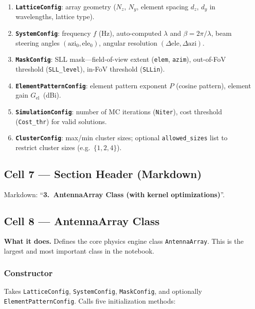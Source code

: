 \documentclass[11pt,a4paper]{article}
\begin{document}
\begin{enumerate}
    \item \textbf{\texttt{LatticeConfig}}: array geometry ($N_z$, $N_y$, element spacing
          $d_z$, $d_y$ in wavelengths, lattice type).
    \item \textbf{\texttt{SystemConfig}}: frequency $f$ (Hz), auto-computed $\lambda$ and
          $\beta = 2\pi/\lambda$, beam steering angles $(\text{azi}_0, \text{ele}_0)$,
          angular resolution $(\Delta\text{ele}, \Delta\text{azi})$.
    \item \textbf{\texttt{MaskConfig}}: SLL mask---field-of-view extent
          (\texttt{elem}, \texttt{azim}), out-of-FoV threshold (\texttt{SLL\_level}),
          in-FoV threshold (\texttt{SLLin}).
    \item \textbf{\texttt{ElementPatternConfig}}: element pattern exponent $P$
          (cosine pattern), element gain $G_{\text{el}}$~(dBi).
    \item \textbf{\texttt{SimulationConfig}}: number of MC iterations (\texttt{Niter}),
          cost threshold (\texttt{Cost\_thr}) for valid solutions.
    \item \textbf{\texttt{ClusterConfig}}: max/min cluster sizes;
          optional \texttt{allowed\_sizes} list to restrict cluster sizes
          (e.g.\ $\{1, 2, 4\}$).
\end{enumerate}

\subsection{Cell 7 --- Section Header (Markdown)}
Markdown: ``\textbf{3.\ AntennaArray Class (with kernel optimizations)}''.

\subsection{Cell 8 --- AntennaArray Class}
\label{sec:cell8}

\textbf{What it does.}
Defines the core physics engine class \texttt{AntennaArray}. This is the largest
and most important class in the notebook.

\subsubsection{Constructor}
Takes \texttt{LatticeConfig}, \texttt{SystemConfig}, \texttt{MaskConfig}, and
optionally \texttt{ElementPatternConfig}. Calls five initialization methods:
\end{document}
